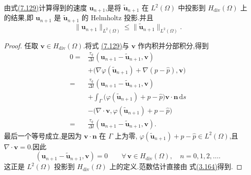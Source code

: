 \begin{lemma}[式(7.129)的投影性质]\label{lem:projection-property}
由式\hyperref[eq:projection-correction-step]{(7.129)}计算得到的速度
$\bm{u}_{n+1}$,是将 $\widetilde{\bm{u}}_{n+1}$ 在
$L^2(\Omega)$ 中投影到 $H_{\mathrm{div}}(\Omega)$ 上的结果,即
$\bm{u}_{n+1}$ 是 $\widetilde{\bm{u}}_{n+1}$ 的 Helmholtz 投影.并且
\[
  \|\bm{u}_{n+1}\|_{L^2(\Omega)}
  \le \|\widetilde{\bm{u}}_{n+1}\|_{L^2(\Omega)}.
\]
\end{lemma}
\begin{proof}
任取 $\bm{v}\in H_{\mathrm{div}}(\Omega)$.将式
\hyperref[eq:projection-correction-step]{(7.129)}与 $\bm{v}$ 作内积并分部积分,得到
\[
\begin{aligned}
0={}&\frac{\tau_q}{\Delta t}
  (\bm{u}_{n+1}-\widetilde{\bm{u}}_{n+1},\bm{v})\\
 &+\bigl(\nabla\varphi(\widetilde{\bm{u}}_{n+1})
       +\nabla(p-\widehat p),\bm{v}\bigr)\\
={}&\frac{\tau_q}{\Delta t}
  (\bm{u}_{n+1}-\widetilde{\bm{u}}_{n+1},\bm{v})\\
 &+\int_{\Gamma}
   \bigl(\varphi(\widetilde{\bm{u}}_{n+1})+p-\widehat p\bigr)
   \bm{v}\cdot\bm{n}\,\mathrm{d}s\\
 &-\bigl(\nabla\cdot\bm{v},
   \varphi(\widetilde{\bm{u}}_{n+1})+p-\widehat p\bigr)\\
={}&\frac{\tau_q}{\Delta t}
  (\bm{u}_{n+1}-\widetilde{\bm{u}}_{n+1},\bm{v}).
\end{aligned}
\]
最后一个等号成立,是因为 $\bm{v}\cdot\bm{n}$ 在 $\Gamma$ 上为零,
$\varphi(\widetilde{\bm{u}}_{n+1})+p-\widehat p\in L^2(\Omega)$,且
$\nabla\cdot\bm{v}=0$.因此
\[
 (\bm{u}_{n+1}-\widetilde{\bm{u}}_{n+1},\bm{v})=0
 \qquad\forall\,\bm{v}\in H_{\mathrm{div}}(\Omega),\quad n=0,1,2,\ldots.
\]
这正是 $L^2(\Omega)$ 投影到 $H_{\mathrm{div}}(\Omega)$ 上的定义.范数估计直接由
式\hyperref[eq:helmholtz-projection-bound]{(3.164)}得到.
\end{proof}

